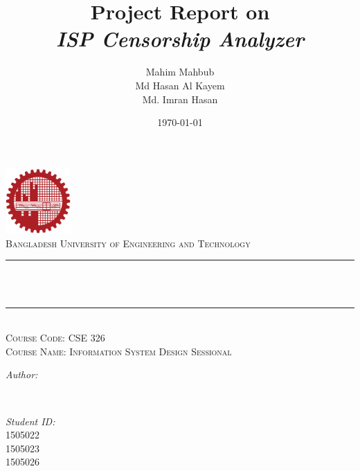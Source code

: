 \documentclass[12pt]{article}
\title{Project Report on \vspace{0.5cm}\\
\emph{ISP Censorship Analyzer}	}
\author{Mahim Mahbub\\
Md Hasan Al Kayem\\
Md. Imran Hasan}
\date{\today}
\makeatletter
\let\thetitle\@title
\let\theauthor\@author
\let\thedate\@date
\makeatother
\begin{document}

\begin{titlepage}
	\centering
    \vspace*{0.5 cm}
    \includegraphics[height=2.5cm]{logo1.png}\\[1.0 cm]	%
    \textsc{\large Bangladesh University of Engineering and Technology}\\[2.0 cm]	%
	\rule{\linewidth}{0.2 mm} \\[0.4 cm]
	{ \huge \bfseries \thetitle}\\
	\rule{\linewidth}{0.2 mm} \\[1.5 cm]
	\textsc{\Large Course Code: CSE 326}\\[0.5 cm]				%
	\textsc{\large Course Name: Information System Design Sessional}\\[0.5 cm]				%
    \vspace{1cm}
	\begin{minipage}{0.4\textwidth}
		\begin{flushleft} \large
			\emph{Author:}\\
			\theauthor
			\end{flushleft}
			\end{minipage}~
			\begin{minipage}{0.4\textwidth}
			\begin{flushright} \large
			\emph{Student ID:} \\
			1505022\\
			1505023\\
			1505026
		\end{flushright}
	\end{minipage}\\[2 cm]
	
	{\large \thedate}\\[2 cm]
 
	\vfill
	
\end{titlepage}


\newpage
\end{document}
